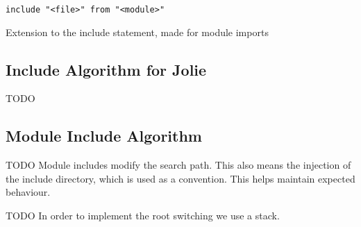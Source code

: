\begin{listing}[H]
\begin{verbatim}
include "<file>" from "<module>"
\end{verbatim}
\caption{Extension to the include statement, made for module imports}
\label{lst:mod_include}
\end{listing}

\subsection{Include Algorithm for Jolie}

TODO

\subsection{Module Include Algorithm}

TODO Module includes modify the search path. This also means the injection of
the include directory, which is used as a convention. This helps maintain
expected behaviour.

TODO In order to implement the root switching we use a stack.
